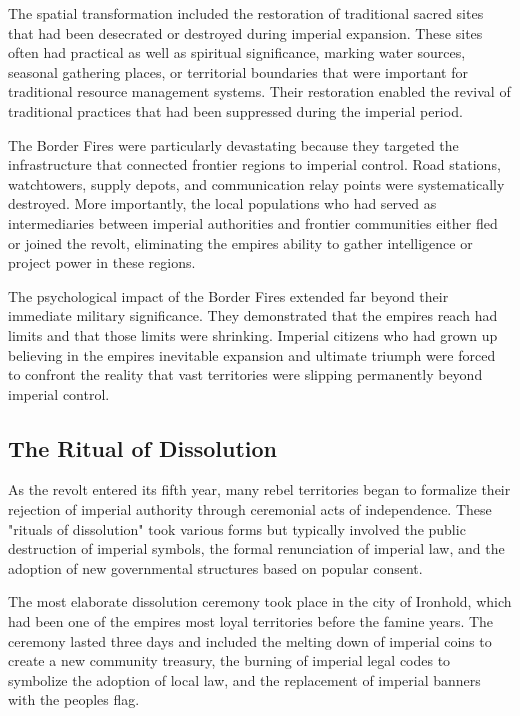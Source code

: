 The spatial transformation included the restoration of traditional
sacred sites that had been desecrated or destroyed during imperial
expansion. These sites often had practical as well as spiritual
significance, marking water sources, seasonal gathering places, or
territorial boundaries that were important for traditional resource
management systems. Their restoration enabled the revival of traditional
practices that had been suppressed during the imperial period.

The Border Fires were particularly devastating because they targeted the
infrastructure that connected frontier regions to imperial control. Road
stations, watchtowers, supply depots, and communication relay points
were systematically destroyed. More importantly, the local populations
who had served as intermediaries between imperial authorities and
frontier communities either fled or joined the revolt, eliminating the
empire\textquotesingle s ability to gather intelligence or project power
in these regions.

The psychological impact of the Border Fires extended far beyond their
immediate military significance. They demonstrated that the
empire\textquotesingle s reach had limits and that those limits were
shrinking. Imperial citizens who had grown up believing in the
empire\textquotesingle s inevitable expansion and ultimate triumph were
forced to confront the reality that vast territories were slipping
permanently beyond imperial control.

\subsection{The Ritual of
Dissolution}\label{the-ritual-of-dissolution-1}

As the revolt entered its fifth year, many rebel territories began to
formalize their rejection of imperial authority through ceremonial acts
of independence. These "rituals of dissolution" took various forms but
typically involved the public destruction of imperial symbols, the
formal renunciation of imperial law, and the adoption of new
governmental structures based on popular consent.

The most elaborate dissolution ceremony took place in the city of
Ironhold, which had been one of the empire\textquotesingle s most loyal
territories before the famine years. The ceremony lasted three days and
included the melting down of imperial coins to create a new community
treasury, the burning of imperial legal codes to symbolize the adoption
of local law, and the replacement of imperial banners with the
people\textquotesingle s flag.

